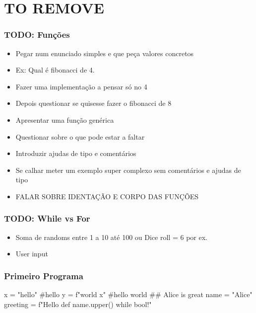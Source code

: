 \documentclass{beamer}
\begin{document}

\section{TO REMOVE}
\begin{frame}
    \frametitle{TODO: Funções}
    \begin{itemize}
        \item Pegar num enunciado simples e que peça valores concretos
        \item Ex: Qual é fibonacci de 4.
        \item Fazer uma implementação a pensar só no 4
        \item Depois questionar se quisesse fazer o fibonacci de 8
        \item Apresentar uma função genérica
        \item Questionar sobre o que pode estar a faltar
        \item Introduzir ajudas de tipo e comentários
        \item Se calhar meter um exemplo super complexo sem comentários e ajudas de tipo
        \item FALAR SOBRE IDENTAÇÃO E CORPO DAS FUNÇÕES
    \end{itemize}
\end{frame}

\begin{frame}
    \frametitle{TODO: While vs For}
    \begin{itemize}
        \item Soma de randoms entre 1 a 10 até 100 ou Dice roll = 6 por ex.
        \item User input
    \end{itemize}
\end{frame}

\begin{frame}[containsverbatim]
    \frametitle{Primeiro Programa}
    \begin{pythonlst}
x = "hello" #hello
y = f"world {x}" #hello {world}
## Alice is great
name = "Alice"
greeting = f"Hello {def name.upper() while bool}!"
    \end{pythonlst}
\end{frame}
\end{document}
